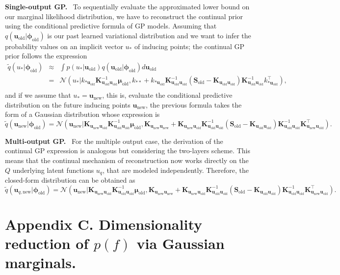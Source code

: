 \documentclass[]{article}
\def\K{{\mathbf K}}
\def\S{{\mathbf S}}
\def\u{{\mathbf u}}
\newcommand{\uold}{{\u_{\text{old}}}}
\newcommand{\unew}{{\u_{\text{new}}}}
\newcommand{\Ncal}{\mathcal{N}}
\newcommand{\phiold}{{\bm{\phi}_{\text{old}}}}
\begin{document}
\textbf{Single-output GP.}~ To sequentially evaluate the approximated lower bound on our marginal likelihood distribution, we have to reconstruct the continual prior using the conditional predictive formula of GP models. Assuming that $q(\uold|\phiold)$ is our past learned variational distribution and we want to infer the probability values on an implicit vector $u_{*}$ of inducing points; the continual GP prior follows the expression
\begin{eqnarray}
	\widetilde{q}(u_{*}|\phiold) &\approx& \int p(u_{*}|\uold)q(\uold|\phiold)d\uold \nonumber\\
	&=& \Ncal (u_{*}| k_{*\uold}\K^{-1}_{\uold\uold}\bm{\mu}_{\text{old}}, k_{**} + k_{*\uold}\K^{-1}_{\uold\uold}(\S_\text{old} - \K_{\uold\uold})\K^{-1}_{\uold\uold}k^{\top}_{*\uold}), \nonumber \\
\end{eqnarray}
\noindent and if we assume that $u_{*} = \unew$, this is, evaluate the conditional predictive distribution on the future inducing points $\unew$, the previous formula takes the form of a Gaussian distribution whose expression is
\begin{equation}
	\widetilde{q}(\unew|\phiold) = \Ncal (\unew | \K_{\unew\uold}\K^{-1}_{\uold\uold}\bm{\mu}_{\text{old}}, \K_{\unew\unew}  + \K_{\unew\uold}\K^{-1}_{\uold\uold}(\S_\text{old} - \K_{\uold\uold})\K^{-1}_{\uold\uold}\K^{\top}_{\unew\uold}). \nonumber
\end{equation}

\textbf{Multi-output GP.}~ For the multiple output case, the derivation of the continual GP expression is analogous but considering the two-layers scheme. This means that the continual mechanism of reconstruction now works directly on the $Q$ underlying latent functions $u_q$, that are modeled independently. Therefore, the closed-form distribution can be obtained as
\begin{equation}
\widetilde{q}(\u_{q,\text{new}}|\phiold) = \Ncal (\unew | \K_{\unew\uold}\K^{-1}_{\uold\uold}\bm{\mu}_{\text{old}}, \K_{\unew\unew}  + \K_{\unew\uold}\K^{-1}_{\uold\uold}(\S_\text{old} - \K_{\uold\uold})\K^{-1}_{\uold\uold}\K^{\top}_{\unew\uold}). \nonumber
\end{equation}

\section*{Appendix C. Dimensionality reduction of $p(f)$ via Gaussian marginals.}
\end{document}
